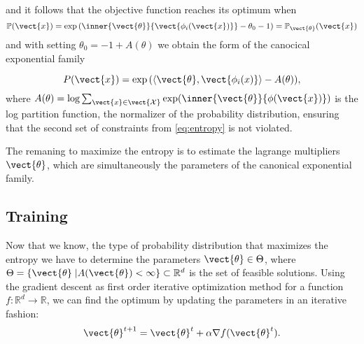     and it follows that the objective function reaches its optimum when 
    \begin{equation}   
        \mathbb{P}(\vect{x}) = \exp{(\inner{\vect{\theta}}{\vect{\phi_i(\vect{x})}} - \theta_0 - 1)} = \mathbb{P}_{\vect{\theta}}(\vect{x})
    \end{equation} 
    and with setting $\theta_0 = -1 + A(\theta) $ we obtain the form of the canocical exponential family

    \begin{equation}
        P(\vect{x}) = \exp{(\langle\vect{\theta}, \vect{\phi_i(x)} \rangle - A(\theta))},
    \end{equation}
    where $A(\theta) = \log \sum_{\vect{x}\in \vect{\mathcal{X}}} \exp(\inner{\vect{\theta}}{\phi(\vect{x})})$ is the log partition function, the normalizer of the probability distribution, ensuring that the second set of constraints from \eq\ref{eq:entropy} is not violated.
    
    The remaning to maximize the entropy is to estimate the lagrange multipliers $\vect{\theta}$, which are simultaneously the parameters of the canonical exponential family.

    \subsection{Training}
    \label{ssec:train}

    Now that we know, the type of  probability distribution that maximizes the entropy we have to determine the parameters $\vect{\theta} \in \Theta$, where $\Theta = \{\vect{\theta} \;\lvert A(\vect{\theta}) < \infty\} \subset \mathbb{R}^d$ is the set of feasible solutions.
    Using the gradient descent as first order iterative optimization method for a function $f: \mathbb{R}^d \rightarrow \mathbb{R}$, we can find the optimum by updating the parameters in an iterative fashion:
    \begin{equation}
        \label{eq:gradesc}
        \vect{\theta}^{t+1} = \vect{\theta}^{t} + \alpha \nabla f(\vect{\theta}^{t}).
    \end{equation}


